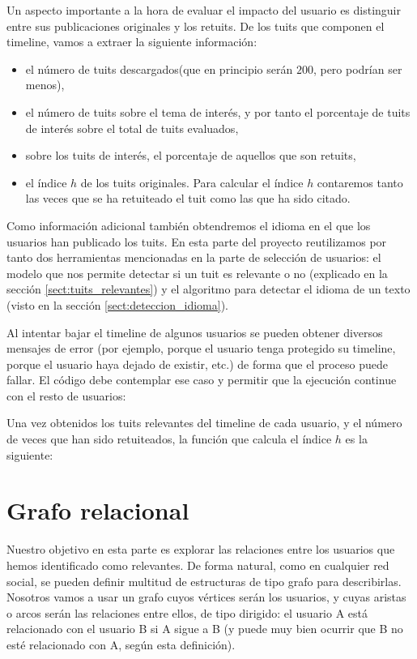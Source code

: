 Un aspecto importante a la hora de evaluar el impacto del usuario es distinguir 
entre sus publicaciones originales y los retuits. De los tuits que componen el 
timeline, vamos a extraer la siguiente información:
\begin{itemize}
\item el número de tuits descargados(que 
en principio serán $200$, pero podrían ser menos),
\item el número de tuits sobre el tema de interés, y por tanto el
porcentaje de tuits de interés sobre el total de tuits evaluados,
\item sobre los tuits de interés, el porcentaje de aquellos que son retuits,
\item el índice $h$ de los tuits originales. Para calcular el índice $h$ 
contaremos tanto las veces que se ha retuiteado el tuit como las que ha sido
citado.
\end{itemize}

Como información adicional también obtendremos el idioma en el que los usuarios han 
publicado los tuits. En esta parte del proyecto reutilizamos por tanto dos herramientas
mencionadas en la parte de selección de usuarios: el modelo que nos permite detectar si
un tuit es relevante o no (explicado en la sección \ref{sect:tuits_relevantes})
y el algoritmo para detectar el idioma de un texto (visto en la sección \ref{sect:deteccion_idioma}).

Al intentar bajar el timeline de algunos usuarios se pueden
obtener diversos mensajes de error (por ejemplo, porque el usuario tenga
protegido su timeline, porque el usuario haya dejado de existir, etc.)
de forma que el proceso puede fallar. El código debe contemplar ese
caso y permitir que la ejecución continue con el resto de usuarios:


Una vez obtenidos los tuits relevantes del timeline de cada usuario, y
el número de veces que han sido retuiteados, la función que calcula el índice
$h$ es la siguiente:


\section{Grafo relacional}
\label{subsect:grafo}
Nuestro objetivo en esta parte es explorar las relaciones entre los usuarios que 
hemos identificado como relevantes. De forma natural, como en cualquier red social,
se pueden definir multitud de estructuras de tipo grafo para describirlas. Nosotros
vamos a usar un grafo cuyos vértices serán los usuarios, y cuyas aristas o arcos serán
las relaciones entre ellos, de tipo dirigido: el usuario A está relacionado con el
usuario B si A sigue a B (y puede muy bien ocurrir que B no esté relacionado con A,
según esta definición). 

